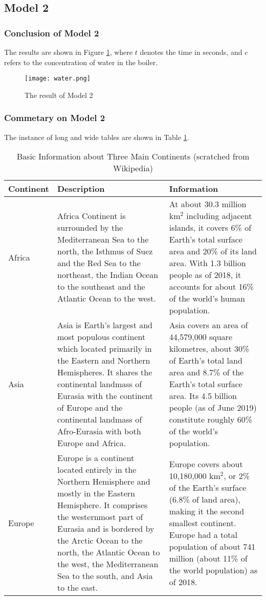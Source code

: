 \documentclass[12pt]{article}  %
\begin{document}
\subsection{Model 2}
\subsubsection{Conclusion of Model 2}
The results are shown in Figure \ref{fig:result}, where $t$ denotes the time in seconds, and $c$ refers to the concentration of water in the boiler.

\begin{figure}[htbp]
\centering
\texttt{[image: water.png]}
\caption{The result of Model 2}\label{fig:result}
\end{figure}

\clearpage
\subsubsection{Commetary on Model 2}
The instance of long and wide tables are shown in Table \ref{tb:longtable}.

\begin{longtable}{ p{4em} p{14em} p{14em} }
\caption{Basic Information about Three Main Continents (scratched from Wikipedia)}
\label{tb:longtable}\\
\toprule
Continent & Description & Information \\
\midrule
Africa & Africa Continent is surrounded by the Mediterranean Sea to the
north, the Isthmus of Suez and the Red Sea to the northeast, the Indian
Ocean to the southeast and the Atlantic Ocean to the west. &
At about 30.3 million km$^2$ including adjacent islands, it covers 6\%
of Earth's total surface area and 20\% of its land area. With 1.3
billion people as of 2018, it accounts for about 16\% of the world's
human population. \\
\midrule
Asia & Asia is Earth's largest and most populous continent which
located primarily in the Eastern and Northern Hemispheres.
It shares the continental landmass of Eurasia with the continent
of Europe and the continental landmass of Afro-Eurasia with both
Europe and Africa. &
Asia covers an area of 44,579,000 square kilometres, about 30\%
of Earth's total land area and 8.7\% of the Earth's total surface
area. Its 4.5 billion people (as of June 2019) constitute roughly
60\% of the world's population. \\
\midrule
Europe & Europe is a continent located entirely in the Northern
Hemisphere and mostly in the Eastern Hemisphere. It comprises the
westernmost part of Eurasia and is bordered by the Arctic Ocean to
the north, the Atlantic Ocean to the west, the Mediterranean Sea to
the south, and Asia to the east. &
Europe covers about 10,180,000 km$^2$, or 2\% of the Earth's surface
(6.8\% of land area), making it the second smallest
continent. Europe had a total population of about 741 million (about
11\% of the world population) as of 2018. \\
\bottomrule
\end{longtable}
\end{document}
